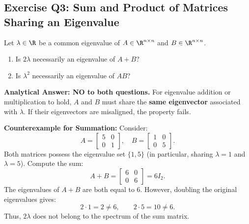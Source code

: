 \subsection{Exercise Q3: Sum and Product of Matrices Sharing an Eigenvalue}

\begin{example}
\label{ex:q3-sum-product}
Let $\lambda \in \R$ be a common eigenvalue of $A \in \R^{n \times n}$ and $B \in \R^{n \times n}$.
\begin{enumerate}
    \item Is $2\lambda$ necessarily an eigenvalue of $A + B$?
    \item Is $\lambda^2$ necessarily an eigenvalue of $AB$?
\end{enumerate}

\noindent\textbf{Analytical Answer: NO to both questions.}
For eigenvalue addition or multiplication to hold, $A$ and $B$ must share the \textbf{same eigenvector} associated with $\lambda$. If their eigenvectors are misaligned, the property fails.

\medskip
\noindent\textbf{Counterexample for Summation:}
Consider:
\begin{equation}
    A = \begin{bmatrix} 5 & 0 \\ 0 & 1 \end{bmatrix}, \quad B = \begin{bmatrix} 1 & 0 \\ 0 & 5 \end{bmatrix}.
\end{equation}
Both matrices possess the eigenvalue set $\{1, 5\}$ (in particular, sharing $\lambda = 1$ and $\lambda = 5$). Compute the sum:
\begin{equation}
    A + B = \begin{bmatrix} 6 & 0 \\ 0 & 6 \end{bmatrix} = 6 I_2.
\end{equation}
The eigenvalues of $A + B$ are both equal to $6$. However, doubling the original eigenvalues gives:
\begin{equation}
    2 \cdot 1 = 2 \neq 6, \qquad 2 \cdot 5 = 10 \neq 6.
\end{equation}
Thus, $2\lambda$ does not belong to the spectrum of the sum matrix.


\end{example}
